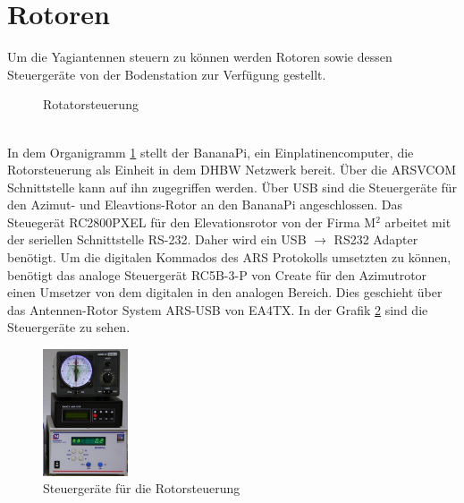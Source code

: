 \section{Rotoren}
Um die Yagiantennen steuern zu können werden Rotoren sowie dessen Steuergeräte von der Bodenstation zur Verfügung gestellt.
\begin{figure}[h]
 \centering
 
 \caption{Rotatorsteuerung}
 \label{fig:azel}
\end{figure}\\
In dem Organigramm \ref{fig:azel} stellt der BananaPi, ein Einplatinencomputer, die Rotorsteuerung als Einheit in dem DHBW Netzwerk bereit. Über die 
ARSVCOM Schnittstelle kann auf ihn zugegriffen werden. %
Über USB sind die Steuergeräte für den Azimut- und Eleavtions-Rotor an den BananaPi angeschlossen. Das Steuegerät RC2800PXEL für den Elevationsrotor 
von der Firma M$^2$ arbeitet mit der seriellen Schnittstelle RS-232. Daher wird ein USB $\rightarrow$ RS232 Adapter benötigt. Um die digitalen 
Kommados des ARS Protokolls umsetzten zu können, benötigt das analoge Steuergerät RC5B-3-P von Create für den Azimutrotor einen Umsetzer von dem 
digitalen in den analogen Bereich. Dies geschieht über das Antennen-Rotor System ARS-USB von EA4TX. In der Grafik \ref{fig:rot} sind die Steuergeräte 
zu sehen.
\begin{figure}[h]
 \centering
 \includegraphics[width=0.225\textwidth]{images/sat-rotor-steuerungen}
 \caption{Steuergeräte für die Rotorsteuerung}
 \label{fig:rot}
\end{figure}
\clearpage

